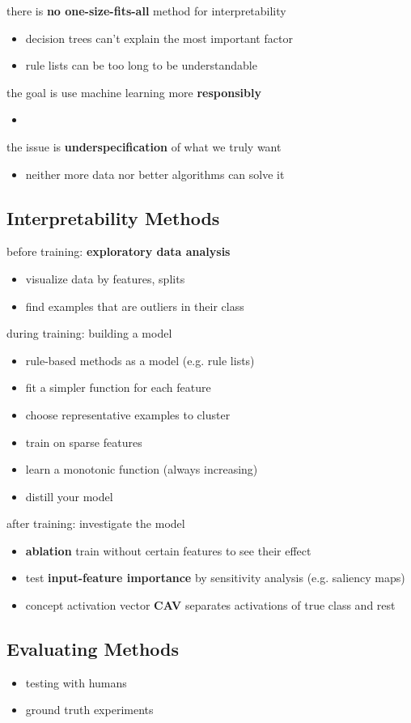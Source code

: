 \documentclass[]{article}
\theoremstyle{definition}
\begin{document}
    there is \textbf{no one-size-fits-all} method for interpretability
    \begin{itemize}
        \item decision trees can't explain the most important factor
        \item rule lists can be too long to be understandable
    \end{itemize}

    the goal is use machine learning more \textbf{responsibly}
    \begin{itemize}
        \item
    \end{itemize}

    the issue is \textbf{underspecification} of what we truly want
    \begin{itemize}
        \item neither more data nor better algorithms can solve it
    \end{itemize}

    \subsection{Interpretability Methods}%
    \label{sub:interpretability_methods}

    before training: \textbf{exploratory data analysis}
    \begin{itemize}
        \item visualize data by features, splits
        \item find examples that are outliers in their class
    \end{itemize}

    during training: building a model
    \begin{itemize}
        \item rule-based methods as a model (e.g. rule lists)
        \item fit a simpler function for each feature
        \item choose representative examples to cluster
        \item train on sparse features
        \item learn a monotonic function (always increasing)
        \item distill your model
    \end{itemize}

    after training: investigate the model
    \begin{itemize}
        \item \textbf{ablation} train without certain features to see their effect
        \item test \textbf{input-feature importance} by sensitivity analysis (e.g. saliency maps)
        \item concept activation vector \textbf{CAV} separates activations of true class and rest
    \end{itemize}

    \subsection{Evaluating Methods}%
    \label{sub:evaluating_methods}

    \begin{itemize}
        \item testing with humans
        \item ground truth experiments
    \end{itemize}
\end{document}
